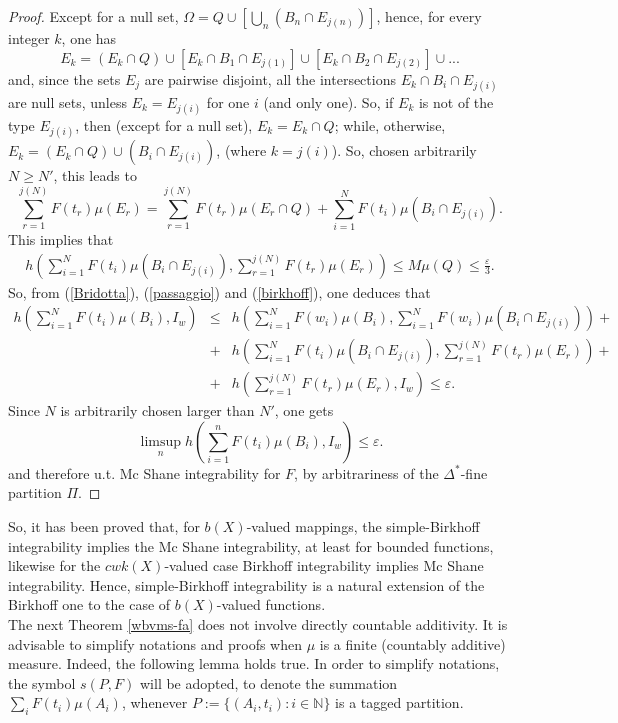 \documentclass[11pt,a4paper,twoside]{amsart}
\begin{document}
\begin{proof}
Except for a null set, $\Omega=Q\cup[\bigcup_n(B_n\cap E_{j(n)})]$,
hence, for every integer $k$, one has
$$E_k=(E_k\cap Q)\cup [E_k\cap B_1\cap E_{j(1)}]\cup [E_k\cap B_2\cap E_{j(2)}]\cup...$$
and, since the sets $E_j$ are pairwise disjoint, all the intersections $E_k\cap B_i\cap E_{j(i)}$ are null sets, unless $E_k=E_{j(i)}$ for one $i$ (and only one). So, if $E_k$ is not of the type $E_{j(i)}$, then (except for a null set), $E_k=E_k\cap Q$; while, otherwise, $E_k=(E_k\cap Q)\cup (B_i\cap E_{j(i)})$,
(where $k=j(i)$). 
So, chosen arbitrarily $N\geq N'$, this leads to
$$\sum_{r=1}^{j(N)}F(t_r)\mu(E_r)=\sum_{r=1}^{j(N)}
F(t_r)\mu(E_r\cap Q)+\sum_{i=1}^NF(t_i)\mu(B_i\cap E_{j(i)}).$$
This implies that
\begin{eqnarray}\label{passaggio}
h\left(\sum_{i=1}^NF(t_i)\mu(B_i\cap E_{j(i)}),\sum_{r=1}^{j(N)}F(t_r)\mu(E_r)\right)\leq M\mu(Q)\leq \frac{\varepsilon}{3}.
\end{eqnarray}
So, from (\ref{Bridotta}), (\ref{passaggio}) and (\ref{birkhoff}), one deduces that
\begin{eqnarray*}
h\left(\sum_{i=1}^NF(t_i)\mu(B_i),I_w\right) &\leq&
h\left(\sum_{i=1}^N F(w_i)\mu(B_i),\sum_{i=1}^N F(w_i)\mu(B_i\cap E_{j(i)})\right)+
\\ &+&
h\left(\sum_{i=1}^NF(t_i)\mu(B_i\cap E_{j(i)}),\sum_{r=1}^{j(N)}F(t_r)\mu(E_r)\right)+
\\ &+&
h\left(\sum_{r=1}^{j(N)}F(t_r)\mu(E_r),I_w\right)\leq {\varepsilon}.
\end{eqnarray*}
Since $N$ is arbitrarily chosen larger than $N'$, one gets
$$\limsup_nh\left(\sum_{i=1}^nF(t_i)\mu(B_i),I_w\right)\leq {\varepsilon}.$$
and therefore u.t. Mc Shane integrability for $F$, by arbitrariness of the $\Delta^*$-fine partition $\Pi$. 
\end{proof}

So, it has been proved that, for $b(X)$-valued mappings, the simple-Birkhoff integrability implies the Mc Shane integrability, at least for bounded functions, likewise for the $cwk(X)$-valued case Birkhoff integrability implies Mc Shane integrability. Hence, simple-Birkhoff integrability is a natural extension of the Birkhoff one to the case of $b(X)$-valued functions.\\

The next Theorem \ref{wbvms-fa} does not involve directly countable additivity.
It is advisable to simplify notations and proofs when $\mu$ is a finite (countably additive) measure. Indeed, the following lemma holds true.
  In order to simplify notations, the symbol $s(P,F)$ will be adopted, to denote the summation $\sum_i F(t_i)\mu(A_i)$, whenever $P:=\{(A_i,t_i): i\in \mathbb{N}\} $ is a tagged partition.\\
\end{document}
